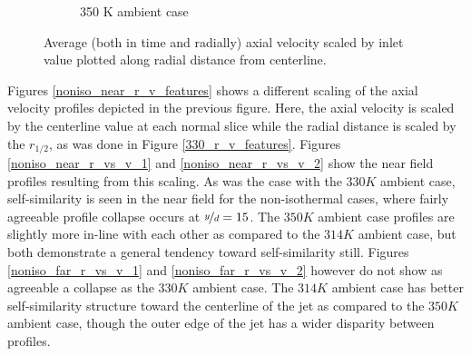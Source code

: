 \begin{figure}[H]
\begin{center}
\begin{subfigure}{0.45\textwidth}
	\caption{350 K ambient case} \label{noniso_v_vin_r_d_2}
\end{subfigure}
\caption{Average (both in time and radially) axial velocity scaled by inlet value plotted along radial distance from centerline.}
\label{noniso_v_vin_r_d_features}
\end{center}
\end{figure}
Figures \ref{noniso_near_r_v_features} shows a different scaling of the axial velocity profiles depicted in the previous figure. Here, the axial velocity is scaled by the centerline value at each normal slice while the radial distance is scaled by the $r_{1/2}$, as was done in Figure \ref{330_r_v_features}. Figures \ref{noniso_near_r_vs_v_1} and \ref{noniso_near_r_vs_v_2} show the near field profiles resulting from this scaling. As was the case with the $330 K $ ambient case, self-similarity is seen in the near field for the non-isothermal cases, where fairly agreeable profile collapse occurs at $\nicefrac{y}{d} = 15$. The $350 K$ ambient case profiles are slightly more in-line with each other as compared to the $314 K$ ambient case, but both demonstrate a general tendency toward self-similarity still. Figures \ref{noniso_far_r_vs_v_1} and \ref{noniso_far_r_vs_v_2} however do not show as agreeable a collapse as the $330 K$ ambient case. The $314 K$ ambient case has better self-similarity structure toward the centerline of the jet as compared to the $350 K$ ambient case, though the outer edge of the jet has a wider disparity between profiles. 
